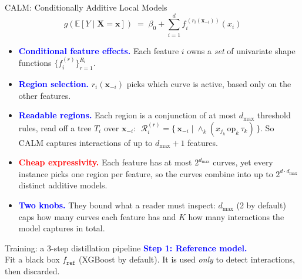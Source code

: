 \documentclass[final]{beamer}
\newcommand{\xb}{\mathbf{x}}
\newcommand{\xbi}{\mathbf{x}_{-i}}
\newcommand{\Xb}{\mathbf{X}}
\newlength{\colwidth}
\begin{document}
\begin{frame}[t,fragile]
\begin{columns}[t]
\begin{column}{\colwidth}
      \begin{defbox}{CALM: Conditionally Additive Local Models}
        \begin{equation*}
          g\left(\mathbb{E}[Y \mid \Xb = \xb]\right)
            \;=\; \beta_0 + \sum_{i=1}^{d} f_i^{\,(r_i(\xbi))}(x_i)
        \end{equation*}
        \begin{itemize}
          \item \textcolor{blue}{\textbf{Conditional feature effects.}} Each feature $i$ owns a
            \emph{set} of univariate shape functions $\{f_i^{(r)}\}_{r=1}^{R_i}$.
          \item \textcolor{blue}{\textbf{Region selection.}} $r_i(\xbi)$ picks which curve is
            active, based only on the other features.
          \item \textcolor{blue}{\textbf{Readable regions.}} Each region is a conjunction of at
            most $d_{\max}$ threshold rules, read off a tree $T_i$ over $\xbi$:
            $\;\mathcal{R}_i^{(r)} = \{\, \xbi \mid \wedge_k (x_{j_k}\,\text{op}_k\,\tau_k) \,\}$.
            So CALM captures interactions of up to $d_{\max}+1$ features.
          \item \textcolor{red}{\textbf{Cheap expressivity.}} Each feature has at most
            $2^{d_{\max}}$ curves, yet every instance picks one region per feature, so the curves
            combine into up to $2^{d\cdot d_{\max}}$ distinct additive models.
          \item \textcolor{blue}{\textbf{Two knobs.}} They bound what a reader must inspect:
            $d_{\max}$ (2 by default) caps how many curves each feature has and $K$ how many
            interactions the model captures in total.
        \end{itemize}
      \end{defbox}

      \begin{block}{Training: a 3-step distillation pipeline}
        \textbf{\textcolor{blue}{Step 1: Reference model.}} \\
        Fit a black box $f_{\texttt{ref}}$ (XGBoost by default).
        It is used \emph{only} to detect interactions, then discarded.


\end{block}
\end{column}
\end{columns}
\end{frame}
\end{document}
